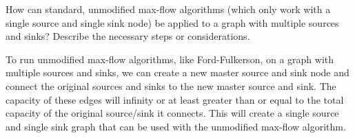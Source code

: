 \documentclass[12pt]{exam}
\newcommand{\stars}[1]{%
    \foreach \n in {1,...,#1}{%
        $\filledstar$%
    }%
}
\begin{document}
\begin{questions}
    \clearpage
    \question[20] [W7, \stars{3}] How can standard, unmodified max-flow algorithms (which only work with a single source and single sink node) be applied to a graph with multiple sources and sinks? Describe the necessary steps or considerations.

    To run unmodified max-flow algorithms, like Ford-Fulkerson, on a graph with multiple sources and sinks, we can create a new master source and sink node and connect the original sources and sinks to the new master source and sink. The capacity of these edges will infinity or at least greater than or equal to the total capacity of the original source/sink it connects. This will create a single source and single sink graph that can be used with the unmodified max-flow algorithm.

    \clearpage

\end{questions}
\end{document}
